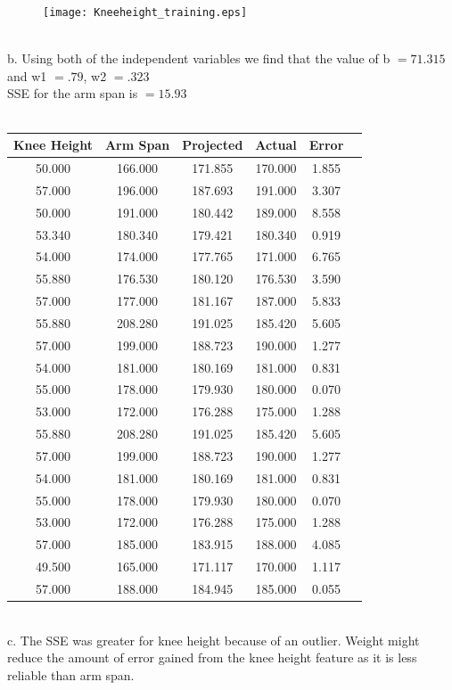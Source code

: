 \documentclass[letterpaper,10pt,titlepage]{article}
\begin{document}
{\begin{figure}[th!]
\centering
\texttt{[image: Kneeheight\_training.eps]} 
\end{figure} 
\\[10mm]
b. Using both of the independent variables we find that the value of b $= 71.315$ and w1 $= .79$, w2 $= .323$ \\
SSE for the arm span is $= 15.93$ \\
\\[5mm]
\begin{tabular}{ | c | c | c | c | c | p{10cm} | }
\hline
Knee Height & Arm Span & Projected & Actual & Error \\ \hline
50.000      & 166.000  & 171.855   & 170.000 & 1.855 \\
57.000      & 196.000  & 187.693   & 191.000 & 3.307 \\
50.000      & 191.000  & 180.442   & 189.000 & 8.558 \\
53.340      & 180.340  & 179.421   & 180.340 & 0.919 \\
54.000      & 174.000  & 177.765   & 171.000 & 6.765 \\
55.880      & 176.530  & 180.120   & 176.530 & 3.590 \\
57.000      & 177.000  & 181.167   & 187.000 & 5.833 \\
55.880      & 208.280  & 191.025   & 185.420 & 5.605 \\
57.000      & 199.000  & 188.723   & 190.000 & 1.277 \\
54.000      & 181.000  & 180.169   & 181.000 & 0.831 \\
55.000      & 178.000  & 179.930   & 180.000 & 0.070 \\
53.000      & 172.000  & 176.288   & 175.000 & 1.288 \\
55.880      & 208.280  & 191.025   & 185.420 & 5.605 \\
57.000      & 199.000  & 188.723   & 190.000 & 1.277 \\
54.000      & 181.000  & 180.169   & 181.000 & 0.831 \\
55.000      & 178.000  & 179.930   & 180.000 & 0.070 \\
53.000      & 172.000  & 176.288   & 175.000 & 1.288 \\
57.000      & 185.000  & 183.915   & 188.000 & 4.085 \\
49.500      & 165.000  & 171.117   & 170.000 & 1.117 \\
57.000      & 188.000  & 184.945   & 185.000 & 0.055 \\ \hline
\end{tabular} 
\\[10mm]
c. The SSE was greater for knee height because of an outlier. Weight might reduce the amount of error gained from the knee height feature as it is less reliable than arm span. \\

}
\end{document}
